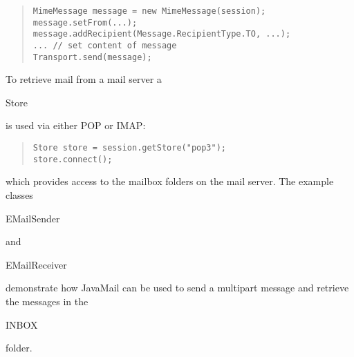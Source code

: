 \begin{quote}\begin{code}\begin{verbatim}
MimeMessage message = new MimeMessage(session);
message.setFrom(...);
message.addRecipient(Message.RecipientType.TO, ...);
... // set content of message
Transport.send(message);
\end{verbatim}\end{code}\end{quote}
To retrieve mail from a mail server a \begin{code}Store\end{code} is used via either POP or IMAP:
\begin{quote}\begin{code}\begin{verbatim}
Store store = session.getStore("pop3");
store.connect();
\end{verbatim}\end{code}\end{quote}
which provides access to the mailbox folders on the mail server.
The example classes \begin{code}EMailSender\end{code} and \begin{code}EMailReceiver\end{code}
demonstrate how JavaMail can be used to send a multipart message and retrieve the
messages in the \begin{code}INBOX\end{code} folder.


